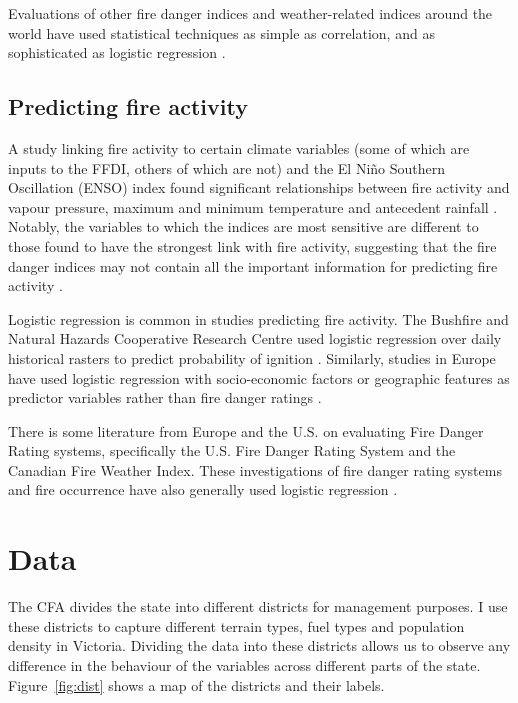 \documentclass[11pt,a4paper]{article}
\begin{document}
Evaluations of other fire danger indices and weather-related indices around the world have used statistical techniques as simple as correlation, and as sophisticated as logistic regression \citep{andrews03,harris14}.


\subsection{Predicting fire activity}

A study linking fire activity to certain climate variables (some of which are inputs to the FFDI, others of which are not) and the El Niño Southern Oscillation (ENSO) index found significant relationships between fire activity and vapour pressure, maximum and minimum temperature and antecedent rainfall \citep{harris14}. Notably, the variables to which the indices are most sensitive are different to those found to have the strongest link with fire activity, suggesting that the fire danger indices may not contain all the important information for predicting fire activity \citep{harris14}.

Logistic regression is common in studies predicting fire activity. The Bushfire and Natural Hazards Cooperative Research Centre used logistic regression over daily historical rasters to predict probability of ignition \citep{Read2015-hn}. Similarly, studies in Europe have used logistic regression with socio-economic factors or geographic features as predictor variables rather than fire danger ratings \citep{del11, zhang13}.

There is some literature from Europe and the U.S. on evaluating Fire Danger Rating systems, specifically the U.S. Fire Danger Rating System and the Canadian Fire Weather Index.  These investigations of fire danger rating systems and fire occurrence have also  generally used logistic regression \citep{andrews03, padilla11}.

\section{Data}

The CFA divides the state into different districts for management purposes. I use these districts to capture different terrain types, fuel types and population density in Victoria. Dividing the data into these districts allows us to observe any difference in the behaviour of the variables across different parts of the state. Figure~\ref{fig:dist} shows a map of the districts and their labels.
\end{document}
